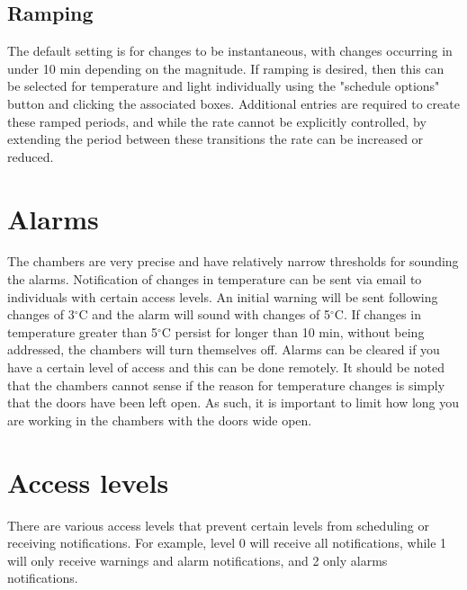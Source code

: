 \documentclass[11pt,a4paper,oneside]{article}
\begin{document}
\subsection{Ramping}
\par The default setting is for changes to be instantaneous, with changes occurring in under 10 min depending on the magnitude. If ramping is desired, then this can be selected for temperature and light individually using the "schedule options" button and clicking the associated boxes. Additional entries are required to create these ramped periods, and while the rate cannot be explicitly controlled, by extending the period between these transitions the rate can be increased or reduced. 

\section{Alarms}

\par The chambers are very precise and have relatively narrow thresholds for sounding the alarms. Notification of changes in temperature can be sent via email to individuals with certain access levels. An initial warning will be sent following changes of 3$^\circ$C and the alarm will sound with changes of 5$^\circ$C. If changes in temperature greater than 5$^\circ$C persist for longer than 10 min, without being addressed, the chambers will turn themselves off. Alarms can be cleared if you have a certain level of access and this can be done remotely. It should be noted that the chambers cannot sense if the reason for temperature changes is simply that the doors have been left open. As such, it is important to limit how long you are working in the chambers with the doors wide open.

\section{Access levels}

\par There are various access levels that prevent certain levels from scheduling or receiving notifications. For example, level 0 will receive all notifications, while 1 will only receive warnings and alarm notifications, and 2 only alarms notifications.  
\end{document}
